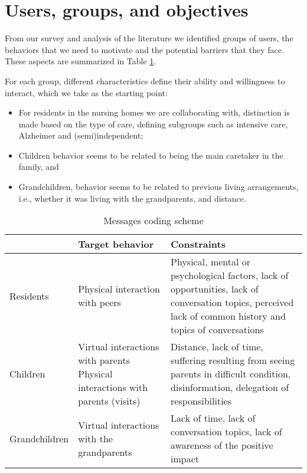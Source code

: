 \documentclass[runningheads,a4paper,oribibl]{llncs}
\begin{document}
\section{Users, groups, and objectives}
From our survey and analysis of the literature we identified groups of users, the behaviors that we need to motivate and the potential barriers that they face. These aspects are summarized in Table \ref{table:groups}.

For each group, different characteristics define their ability and willingness to interact, which we take as the starting point:
\begin{itemize}  
\item For residents in the nursing homes we are collaborating with, distinction is made based on the type of care, defining subgroups such as intensive care, Alzheimer and (semi)independent; 
\item Children behavior seems to be related to being the main caretaker in the family, and
\item Grandchildren, behavior seems to be related to previous living arrangements, i.e., whether it was living with the grandparents, and distance.
\end{itemize}

\begin{table}[t!]
\small
\caption{Messages coding scheme}
\label{table:groups}  
\begin{tabular}{ |p{}| p{} | p{} |} 
\hline
 & Target behavior & Constraints \\ 
\hline

Residents &
Physical interaction with peers &
Physical, mental or psychological factors, lack of opportunities, lack of conversation topics, perceived lack of common history and topics of conversations  \\
\hline

Children &
Virtual interactions with parents
Physical interactions with parents (visits) &
Distance, lack of time, suffering resulting from seeing parents in difficult condition, disinformation, delegation of responsibilities \\
\hline

Grandchildren &
Virtual interactions with the grandparents &
Lack of time, lack of conversation topics, lack of awareness of the positive impact \\

\hline
\end{tabular}  
\end{table}
\end{document}

